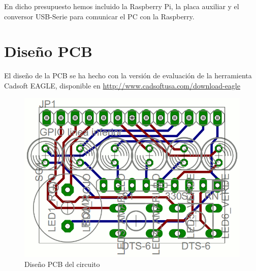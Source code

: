 En dicho presupuesto hemos incluido la Raspberry Pi, la placa auxiliar y el conversor USB-Serie
para comunicar el PC con la Raspberry.

\section{Diseño PCB}

El diseño de la PCB se ha hecho con la versión de evaluación de la herramienta Cadsoft EAGLE,
disponible en \textcolor{blue}{
  \href{http://www.cadsoftusa.com/download-eagle}
  {http://www.cadsoftusa.com/download-eagle}}
 
\begin{figure}[h]
  \centering
    \includegraphics[width=14cm]{graphs/pcb.png}
  \caption{Diseño PCB del circuito}
  \label{fig:pcb}
\end{figure}

\chapterend
